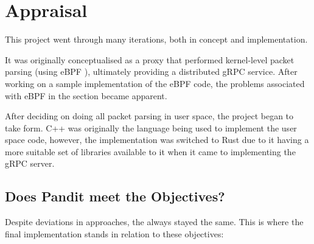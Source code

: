 \documentclass[a4paper,12pt]{report}
\begin{document}
\section{Appraisal}
This project went through many iterations, both in concept and implementation.

It was originally conceptualised as a proxy that performed kernel-level packet parsing (using eBPF \cite{ebpf}), ultimately providing a distributed gRPC service.
After working on a sample implementation of the eBPF code, the problems associated with eBPF in the \textit{} section became apparent.

After deciding on doing all packet parsing in user space, the project began to take form.
C++ was originally the language being used to implement the user space code, however, the implementation was switched to Rust due to it having a more suitable set of libraries available to it when it came to implementing the gRPC server.

\subsection{Does Pandit meet the Objectives?}

Despite deviations in approaches, the  always stayed the same.
This is where the final implementation stands in relation to these objectives:
\end{document}
